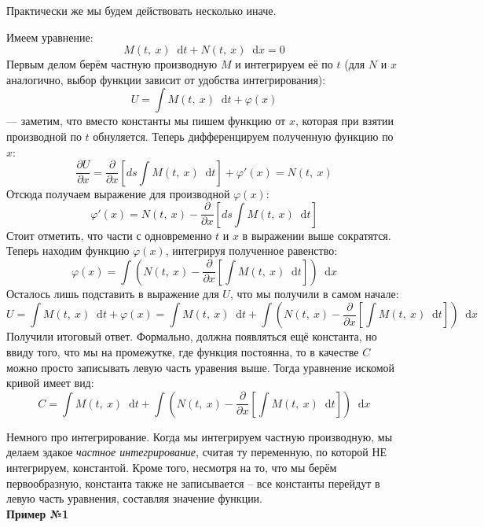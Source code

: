 \documentclass[a4paper,12pt]{article}
\renewcommand*\d{\mathop{}\!\mathrm{d}}
\newcommand{\fe}{\varphi}
\newcommand{\ds}{\displaystyle}
\begin{document}
Практически же мы будем действовать несколько иначе.

Имеем уравнение: 
\[M(t,\ x)\d t + N(t,\ x)\d x = 0\]
Первым делом берём частную производную $M$  и интегрируем её по $t$ (для $N$ и $x$ аналогично, выбор функции зависит от удобства интегрирования):
\[U = \ds\int M(t,\ x)\d t + \fe(x)\] --- заметим, что вместо константы мы пишем функцию от $x$, которая при взятии производной по $t$  обнуляется.
Теперь дифференцируем полученную функцию по $x$:
\[\dfrac{\partial U}{\partial x} = \dfrac{\partial}{\partial x}\left[ds\int M(t,\ x)\d t\right] + \fe'(x) =  N(t,\ x)\]
Отсюда получаем выражение для производной $\fe(x)$:
\[\fe'(x) = N(t,\ x) - \dfrac{\partial}{\partial x}\left[ds\int M(t,\ x)\d t\right]\]
Стоит отметить, что части с одновременно $t$ и $x$ в выражении выше сократятся. Теперь находим функцию $\fe(x)$, интегрируя полученное равенство:
\[\fe(x) = \ds\int\left(N(t,\ x) - \dfrac{\partial}{\partial x}\left[\ds\int M(t,\ x)\d t\right]\right)\d x\]
Осталось лишь подставить в выражение для $U$, что мы получили в самом начале:
\[U = \ds\int M(t,\ x)\d t + \fe(x) = \ds\int M(t,\ x)\d t + \ds\int\left(N(t,\ x) - \dfrac{\partial}{\partial x}\left[\ds\int M(t,\ x)\d t\right]\right)\d x\]
Получили итоговый ответ. Формально, должна появляться ещё константа, но ввиду того, что мы на промежутке, где функция постоянна, то в качестве $C$ можно просто записывать левую часть уравения выше. Тогда уравнение искомой кривой имеет вид:
\[C =  \ds\int M(t,\ x)\d t + \ds\int\left(N(t,\ x) - \dfrac{\partial}{\partial x}\left[\ds\int M(t,\ x)\d t\right]\right)\d x\]

Немного про интегрирование. Когда мы интегрируем частную производную, мы делаем эдакое \textit{частное интегрирование}, считая ту переменную, по которой НЕ интегрируем, константой. Кроме того, несмотря на то, что мы берём первообразную, константа также не записывается -- все константы перейдут в левую часть уравнения, составляя значение функции.
\ \\

\textbf{Пример №1}
\end{document}
